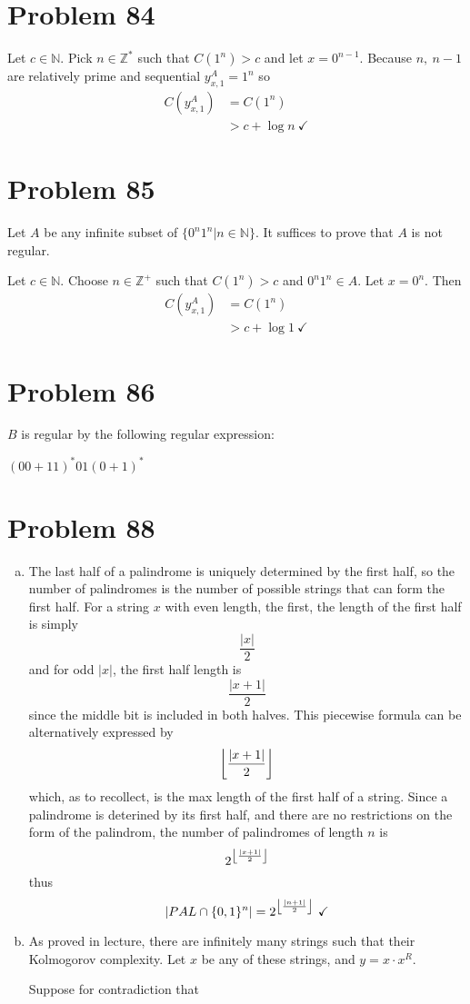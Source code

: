 \documentclass[11pt]{article}
\DeclarePairedDelimiter\floor{\lfloor}{\rfloor}
\begin{document}
\section*{Problem 84}

Let $c \in \mathbb{N}$.
Pick $n \in \mathbb{Z^*}$ such that $C(1^n) > c$ and let $x = 0 ^{n-1}$.
Because $n,\ n-1$ are relatively prime and sequential $y _{x,1} ^{A} = 1^n$ so
	\begin{align*}
		C( y _{x,1} ^{A} ) &= C(1^n) \\
		&> c + \log n \ \checkmark
	\end{align*}


\section*{Problem 85}

Let $A$ be any infinite subset of $\{ 0^n 1^n | n \in \mathbb{N} \}$.
It suffices to prove that $A$ is not regular.

Let $c \in \mathbb{N}$. Choose $n \in \mathbb{Z}^+$ such that $C(1^n) > c$ and $0^n 1^n \in A$.
Let $x = 0^n$.
Then
	\begin{align*}
		C(y_{x,1} ^A) &= C(1^n) \\
		&> c + \log 1 \ \checkmark
	\end{align*}


\section*{Problem 86} $B$ is regular by the following regular expression: 

$(00 + 11)^* 01 (0+1)^* $


\section*{Problem 88}
\begin{enumerate}[(a)]
	\item The last half of a palindrome is uniquely determined by the first half, so the number of palindromes is the number of possible strings that can form the first half. 
	For a string $x$ with even length, the first, the length of the first half is simply 
		\[\frac{|x|}{2} \] 
	and for odd $|x|$, the first half length is
		\[\frac{|x+1|}{2} \]
	since the middle bit is included in both halves.
	This piecewise formula can be alternatively expressed by
		\[\floor*{ \frac{|x+1|}{2} } \]
	which, as to recollect, is the max length of the first half of a string.
	Since a palindrome is deterined by its first half, and there are no restrictions on the form of the palindrom, the number of palindromes of length $n$ is 
		\[2^{\floor*{ \frac{|x+1|}{2} }} \]
	thus
		\[ |PAL \cap \{0,1\}^n| = 2^{\floor*{ \frac{|n+1|}{2} }}\ \checkmark\]

	\item  As proved in lecture, there are infinitely many strings such that their Kolmogorov complexity.
	Let $x$ be any of these strings, and $y = x \cdot x^R$.

	Suppose for contradiction that 
\end{enumerate}
\end{document}
